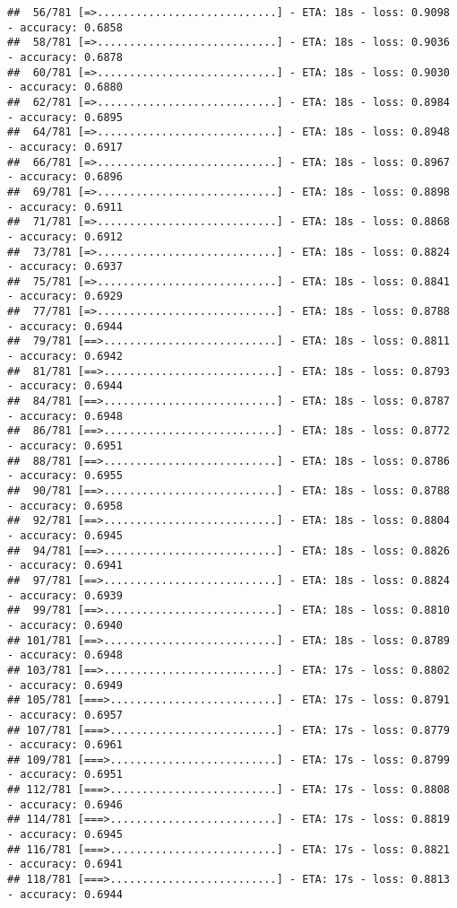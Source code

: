 \documentclass[
]{article}
\begin{document}
\begin{verbatim}
##  56/781 [=>............................] - ETA: 18s - loss: 0.9098 - accuracy: 0.6858
##  58/781 [=>............................] - ETA: 18s - loss: 0.9036 - accuracy: 0.6878
##  60/781 [=>............................] - ETA: 18s - loss: 0.9030 - accuracy: 0.6880
##  62/781 [=>............................] - ETA: 18s - loss: 0.8984 - accuracy: 0.6895
##  64/781 [=>............................] - ETA: 18s - loss: 0.8948 - accuracy: 0.6917
##  66/781 [=>............................] - ETA: 18s - loss: 0.8967 - accuracy: 0.6896
##  69/781 [=>............................] - ETA: 18s - loss: 0.8898 - accuracy: 0.6911
##  71/781 [=>............................] - ETA: 18s - loss: 0.8868 - accuracy: 0.6912
##  73/781 [=>............................] - ETA: 18s - loss: 0.8824 - accuracy: 0.6937
##  75/781 [=>............................] - ETA: 18s - loss: 0.8841 - accuracy: 0.6929
##  77/781 [=>............................] - ETA: 18s - loss: 0.8788 - accuracy: 0.6944
##  79/781 [==>...........................] - ETA: 18s - loss: 0.8811 - accuracy: 0.6942
##  81/781 [==>...........................] - ETA: 18s - loss: 0.8793 - accuracy: 0.6944
##  84/781 [==>...........................] - ETA: 18s - loss: 0.8787 - accuracy: 0.6948
##  86/781 [==>...........................] - ETA: 18s - loss: 0.8772 - accuracy: 0.6951
##  88/781 [==>...........................] - ETA: 18s - loss: 0.8786 - accuracy: 0.6955
##  90/781 [==>...........................] - ETA: 18s - loss: 0.8788 - accuracy: 0.6958
##  92/781 [==>...........................] - ETA: 18s - loss: 0.8804 - accuracy: 0.6945
##  94/781 [==>...........................] - ETA: 18s - loss: 0.8826 - accuracy: 0.6941
##  97/781 [==>...........................] - ETA: 18s - loss: 0.8824 - accuracy: 0.6939
##  99/781 [==>...........................] - ETA: 18s - loss: 0.8810 - accuracy: 0.6940
## 101/781 [==>...........................] - ETA: 18s - loss: 0.8789 - accuracy: 0.6948
## 103/781 [==>...........................] - ETA: 17s - loss: 0.8802 - accuracy: 0.6949
## 105/781 [===>..........................] - ETA: 17s - loss: 0.8791 - accuracy: 0.6957
## 107/781 [===>..........................] - ETA: 17s - loss: 0.8779 - accuracy: 0.6961
## 109/781 [===>..........................] - ETA: 17s - loss: 0.8799 - accuracy: 0.6951
## 112/781 [===>..........................] - ETA: 17s - loss: 0.8808 - accuracy: 0.6946
## 114/781 [===>..........................] - ETA: 17s - loss: 0.8819 - accuracy: 0.6945
## 116/781 [===>..........................] - ETA: 17s - loss: 0.8821 - accuracy: 0.6941
## 118/781 [===>..........................] - ETA: 17s - loss: 0.8813 - accuracy: 0.6944

\end{verbatim}
\end{document}
